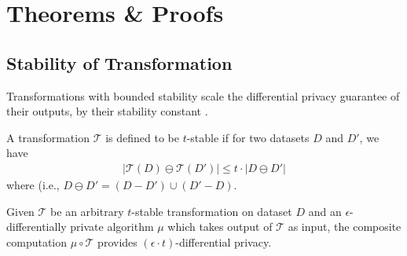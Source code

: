 \section{Theorems \& Proofs}\label{app:proofs}


\subsection{Stability of Transformation}\label{app:stability}
Transformations with bounded stability scale the differential privacy guarantee of their outputs, by their stability constant \cite{PINQ}.
\begin{definition}A transformation $\mathcal{T}$ is defined to be $t$-stable if for two datasets $D$ and $D'$, we have\begin{gather}|\mathcal{T}(D)\ominus \mathcal{T}(D')| \leq t \cdot |D\ominus D'|  \end{gather} where  (i.e.,  $D \ominus D' = (D-D') \cup (D'-D)$. \end{definition}

\begin{theorem}
Given $\mathcal{T}$ be an arbitrary $t$-stable transformation on dataset $D$ and an $\epsilon$-differentially private algorithm $\mu$ which takes output of $\mathcal{T}$ as input, the composite computation $\mu \circ \mathcal{T}$ provides $(\epsilon \cdot t)$-differential privacy.\end{theorem}




